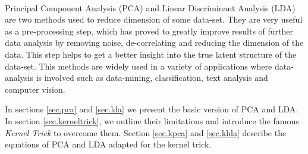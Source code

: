\paragraph{}
Principal Component Analysis (PCA) and Linear Discriminant Analysis (LDA) are two methods used to reduce dimension of some data-set. They are very useful as a pre-processing step, which has proved to greatly improve results of further data analysis by removing noise, de-correlating and reducing the dimension of the data. This step helps to get a better insight into the true latent structure of the data-set. This methods are widely used in a variety of applications where data-analysis is involved such as data-mining, classification, text analysis and computer vision.

In sections \ref{sec.pca} and \ref{sec.lda} we present the basic version of PCA and LDA. In section \ref{sec.kerneltrick}, we outline their limitations and introduce the famous \emph{Kernel Trick} to overcome them. Section \ref{sec.kpca} and \ref{sec.klda} describe the equations of PCA and LDA adapted for the kernel trick.